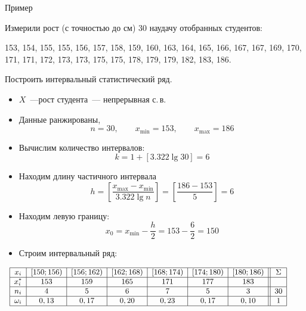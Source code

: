 \documentclass[unicode,11pt,notheorems,xcolor=table]{beamer}
\begin{document}
\begin{frame}[t,allowframebreaks]{Пример}{}
    \begin{exampleblock}{}
        Измерили рост (с точностью до см) 30 наудачу отобранных студентов:
        
        153, 154, 155, 155, 156, 157, 158, 159, 160, 163, 164, 165, 166, 167, 167, 169, 170, 171, 171, 172, 173, 173, 175, 175, 178, 179, 179, 182, 183, 186.
       
        Построить интервальный статистический ряд.    
    \end{exampleblock}
    \begin{itemize}
        \item $X$~---рост студента~--- непрерывная с.\,в. 
        \item Данные ранжированы, 
        $$
        n = 30, \qquad x_{\min}=153, \qquad x_{\max}=186
        $$
        \item Вычислим количество интервалов: 
        $$
            k =  1+ [ 3.322\lg 30 ] = 6
        $$
        \vspace{-5mm}
        \item  Находим длину частичного интервала 
        $$
            h = \left[\frac{x_{\max}-x_{\min}}{ 3.322\lg n }\right] = \left[\frac{186-153}{5}\right]= 6
        $$
        
        \vspace{-2mm}
        \item  Находим левую границу:
        $$
         x_0=x_{\min}-\frac{h}{2} = 153-\frac{6}{2} = 150
        $$
        \vspace{-4mm}
        \item Строим интервальный ряд:
    \end{itemize}

    ~\hspace{-8mm}$
    \small
    \begin{array}{|c|c|c|c|c|c|c||c|}
        \hline
        x_i & \left[150; 156 \right) &  \left[156; 162\right) &  \left[ 162; 168 \right) &  \left[ 168; 174 \right) &  \left[174; 180 \right) &  \left[180; 186 \right) & \Sigma\\
        \hline
        x^*_i & 153 &  159 &  165 &  171 &  177 &  183 & \\        
        \hline
        n_i & 4 & 5 & 6 & 7 & 5 & 3 & 30\\
        \hline
        \omega_i & 0,13 & 0,17 & 0,20 & 0,23 & 0,17 & 0,10 & 1\\
        \hline
    \end{array}
    $
\end{frame}
\end{document}
